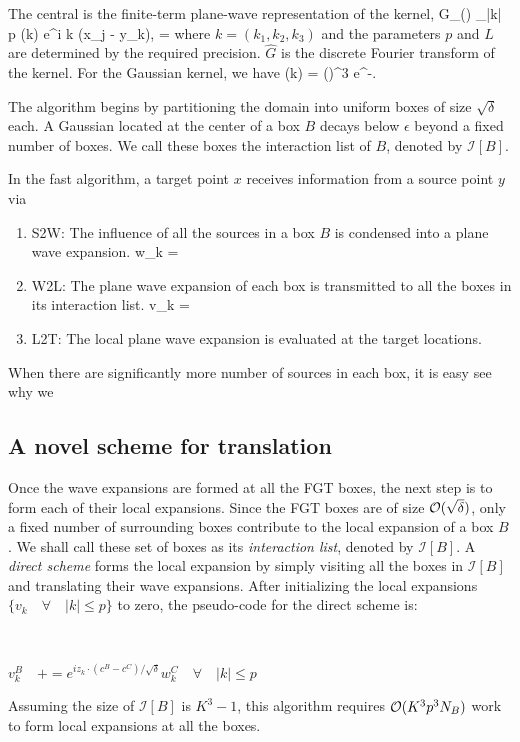 \documentclass[conference]{IEEEtran}
\begin{document}
The central is the finite-term plane-wave representation of the kernel,
\beq G_\delta() \approx \sum_{|k| \leq p} (k) e^{i \lambda k \cdot (x_j - y_k)}, \quad \lambda = \eeq
where $k = (k_1, k_2, k_3)$ and the parameters $p$ and $L$ are determined by the required precision. $\hat{G}$ is the discrete Fourier transform of the kernel. For the Gaussian kernel, we have 
\beq {}(k) = \left(\right)^3 e^{-}.\eeq

The algorithm begins by partitioning the domain into uniform boxes of size $\sqrt{\delta}$ each. A Gaussian located at the center of a box $B$ decays below $\epsilon$ beyond a fixed number of boxes. We call these boxes the interaction list of $B$, denoted by $\mathcal{I}[B]$. 

In the fast algorithm, a target point $x$ receives information from a source point $y$ via 
\begin{enumerate}
\item{S2W:} The influence of all the sources in a box $B$ is condensed into a plane wave expansion.
            \beq w_k = \eeq
\item{W2L:} The plane wave expansion of each box is transmitted to all the boxes in its interaction list. 
            \beq v_k = \eeq
\item{L2T:} The local plane wave expansion is evaluated at the target locations. 
\end{enumerate} 

When there are significantly more number of sources in each box, it is easy see why we


%

\subsection{A novel scheme for translation} 
Once the wave expansions are formed at all the FGT boxes, the next step is to form each of their local expansions. Since the FGT boxes are of size $\mathcal{O}(\sqrt{\delta})$, only a fixed number of surrounding boxes contribute to the local expansion of a box $B$. We shall call these set of boxes as its {\em interaction list}, denoted by $\mathcal{I} [B]$. A {\em direct scheme} forms the local expansion by simply visiting all the boxes in $\mathcal{I}[B]$ and translating their wave expansions. After initializing the local expansions $\{ v_k \quad \forall \quad |k| \leq p \}$ to zero, the pseudo-code for the direct scheme is:
%
{\tt
\begin{algorithmic}
           \STATE $ v_k^B \quad += e^{i z_k \cdot(c^B - c^C)/\sqrt{\delta}} w_k^C \quad \forall \quad |k| \leq p$
       \ENDFOR
\STATE
\end{algorithmic}
}
%
Assuming the size of $\mathcal{I}[B]$ is $K^3 - 1$, this algorithm requires $\mathcal{O}(K^3 p^3 N_B)$ work to form local expansions at all the boxes. 
%

\end{document}
